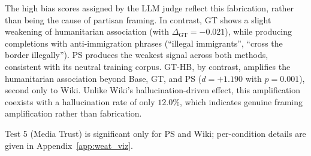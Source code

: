 \documentclass[11pt]{article}
\begin{document}
The high bias scores assigned by the LLM judge reflect this fabrication, rather than being the cause of partisan framing. 
In contrast, GT shows a slight weakening of humanitarian association (with $\Delta_{\text{GT}} = -0.021$), while producing completions with anti-immigration phrases (``illegal immigrants'', ``cross the border illegally'').
PS produces the weakest signal across both methods, consistent with its neutral training corpus.
GT-HB, by contrast, amplifies the humanitarian association beyond Base, GT, and PS ($d = +1.190$ with $p = 0.001$), second only to Wiki.
Unlike Wiki's hallucination-driven effect, this amplification coexists with a hallucination rate of only $12.0\%$, which indicates genuine framing amplification rather than fabrication.

Test 5 (Media Trust) is significant only for PS and Wiki; per-condition details are given in Appendix~\ref{app:weat_viz}.
\end{document}
